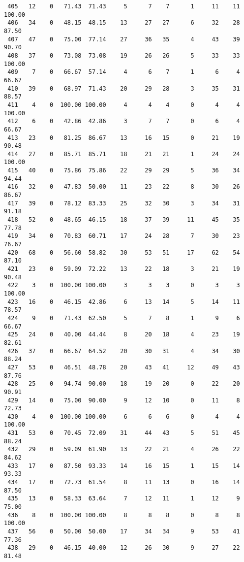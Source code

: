 \begin{verbatim}
 405   12    0   71.43  71.43     5      7    7      1     11    11   100.00
 406   34    0   48.15  48.15    13     27   27      6     32    28    87.50
 407   47    0   75.00  77.14    27     36   35      4     43    39    90.70
 408   37    0   73.08  73.08    19     26   26      5     33    33   100.00
 409    7    0   66.67  57.14     4      6    7      1      6     4    66.67
 410   39    0   68.97  71.43    20     29   28      3     35    31    88.57
 411    4    0  100.00 100.00     4      4    4      0      4     4   100.00
 412    6    0   42.86  42.86     3      7    7      0      6     4    66.67
 413   23    0   81.25  86.67    13     16   15      0     21    19    90.48
 414   27    0   85.71  85.71    18     21   21      1     24    24   100.00
 415   40    0   75.86  75.86    22     29   29      5     36    34    94.44
 416   32    0   47.83  50.00    11     23   22      8     30    26    86.67
 417   39    0   78.12  83.33    25     32   30      3     34    31    91.18
 418   52    0   48.65  46.15    18     37   39     11     45    35    77.78
 419   34    0   70.83  60.71    17     24   28      7     30    23    76.67
 420   68    0   56.60  58.82    30     53   51     17     62    54    87.10
 421   23    0   59.09  72.22    13     22   18      3     21    19    90.48
 422    3    0  100.00 100.00     3      3    3      0      3     3   100.00
 423   16    0   46.15  42.86     6     13   14      5     14    11    78.57
 424    9    0   71.43  62.50     5      7    8      1      9     6    66.67
 425   24    0   40.00  44.44     8     20   18      4     23    19    82.61
 426   37    0   66.67  64.52    20     30   31      4     34    30    88.24
 427   53    0   46.51  48.78    20     43   41     12     49    43    87.76
 428   25    0   94.74  90.00    18     19   20      0     22    20    90.91
 429   14    0   75.00  90.00     9     12   10      0     11     8    72.73
 430    4    0  100.00 100.00     6      6    6      0      4     4   100.00
 431   53    0   70.45  72.09    31     44   43      5     51    45    88.24
 432   29    0   59.09  61.90    13     22   21      4     26    22    84.62
 433   17    0   87.50  93.33    14     16   15      1     15    14    93.33
 434   17    0   72.73  61.54     8     11   13      0     16    14    87.50
 435   13    0   58.33  63.64     7     12   11      1     12     9    75.00
 436    8    0  100.00 100.00     8      8    8      0      8     8   100.00
 437   56    0   50.00  50.00    17     34   34      9     53    41    77.36
 438   29    0   46.15  40.00    12     26   30      9     27    22    81.48

\end{verbatim}

